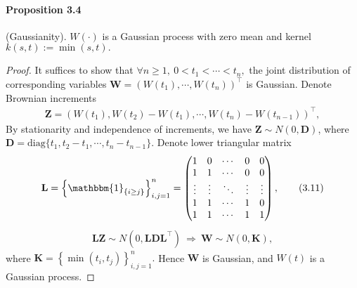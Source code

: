 \documentclass{article}
\begin{document}
\paragraph{Proposition 3.4} (Gaussianity). $W(\cdot)$ is a Gaussian process with zero mean and kernel $k(s,t):=\min(s,t).$
\begin{proof}
It suffices to show that $\forall n\geq 1,\ 0 < t_1 < \cdots < t_n,$ the joint distribution of corresponding variables $\mathbf{W} = (W(t_1),\cdots,W(t_n))^\top$ is Gaussian. Denote Brownian increments
\begin{align*}
	\mathbf{Z}=\left(W(t_1),W(t_2)-W(t_1),\cdots,W(t_n) - W(t_{n-1})\right)^\top,\tag{3.10}
\end{align*}
By stationarity and independence of increments, we have $\mathbf{Z}\sim N(0,\mathbf{D})$, where $\mathbf{D} = \mathrm{diag}\lbrace t_1, t_2-t_1,\cdots,t_n-t_{n-1}\rbrace.$ Denote lower triangular matrix
\begin{align*}
	\mathbf{L} = \left\lbrace\mathbbm{1}_{\{i\geq j\}}\right\rbrace_{i,j=1}^n = 
	\begin{pmatrix} 1 & 0 & \cdots & 0 & 0 \\
		1 & 1 & \cdots & 0 & 0\\
		\vdots & \vdots & \ddots & \vdots & \vdots\\
		1 & 1 & \cdots & 1 & 0\\
		1 & 1 & \cdots & 1 & 1\end{pmatrix},\tag{3.11}
\end{align*}
\begin{align*}
	\mathbf{LZ} \sim N(0,\mathbf{LDL}^\top)\ \Rightarrow\ \mathbf{W}\sim N(0,\mathbf{K}),\tag{3.12}
\end{align*}
where $\mathbf{K}=\left\lbrace \min(t_i,t_j)\right\rbrace_{i,j=1}^n.$ Hence $\mathbf{W}$ is Gaussian, and $W(t)$ is a Gaussian process.
\end{proof} 
\end{document}
